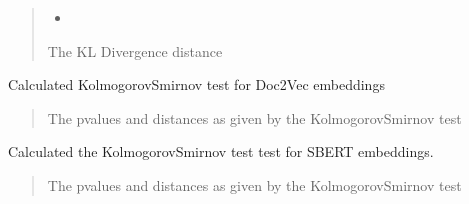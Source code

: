 \documentclass[letterpaper,10pt,english]{sphinxmanual}
\begin{document}
\begin{fulllineitems}
\begin{fulllineitems}
\begin{quote}
\begin{description}
\begin{itemize}
\item {} 
\sphinxAtStartPar
{} \textendash{} 

\end{itemize}

\sphinxAtStartPar
The KL Divergence distance

\end{description}\end{quote}

\end{fulllineitems}


\begin{fulllineitems}
\label{\detokenize{fldModules/myDetectors:myDetectors.myDetectors.ks_doc2vec}}
\pysigstartsignatures
{}
\pysigstopsignatures
\sphinxAtStartPar
Calculated Kolmogorov\textendash{}Smirnov test for Doc2Vec embeddings
\begin{quote}\begin{description}
\sphinxAtStartPar
The p\sphinxhyphen{}values and distances as given by the Kolmogorov\textendash{}Smirnov test

\end{description}\end{quote}

\end{fulllineitems}


\begin{fulllineitems}
\label{\detokenize{fldModules/myDetectors:myDetectors.myDetectors.ks_sbert}}
\pysigstartsignatures
{}
\pysigstopsignatures
\sphinxAtStartPar
Calculated the Kolmogorov\textendash{}Smirnov test test for SBERT embeddings.
\begin{quote}\begin{description}
\sphinxAtStartPar
The p\sphinxhyphen{}values and distances as given by the Kolmogorov\textendash{}Smirnov test

\end{description}\end{quote}


\end{fulllineitems}
\end{fulllineitems}
\end{document}
